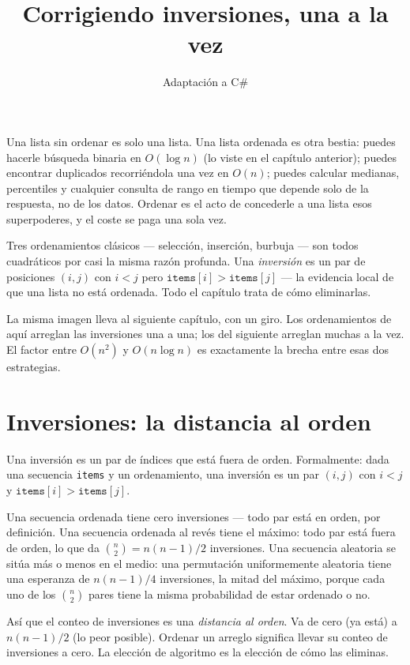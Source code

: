 \documentclass[11pt,a4paper]{article}
\title{Corrigiendo inversiones, una a la vez}
\author{Adaptación a C\#}
\date{}
\begin{document}
\maketitle

Una lista sin ordenar es solo una lista. Una lista ordenada es otra bestia: puedes hacerle búsqueda binaria en $O(\log n)$ (lo viste en el capítulo anterior); puedes encontrar duplicados recorriéndola una vez en $O(n)$; puedes calcular medianas, percentiles y cualquier consulta de rango en tiempo que depende solo de la respuesta, no de los datos. Ordenar es el acto de concederle a una lista esos superpoderes, y el coste se paga una sola vez.

Tres ordenamientos clásicos --- selección, inserción, burbuja --- son todos cuadráticos por casi la misma razón profunda. Una \emph{inversión} es un par de posiciones $(i, j)$ con $i < j$ pero $\texttt{items}[i] > \texttt{items}[j]$ --- la evidencia local de que una lista no está ordenada. Todo el capítulo trata de cómo eliminarlas.

La misma imagen lleva al siguiente capítulo, con un giro. Los ordenamientos de aquí arreglan las inversiones una a una; los del siguiente arreglan muchas a la vez. El factor entre $O(n^2)$ y $O(n \log n)$ es exactamente la brecha entre esas dos estrategias.

\section{Inversiones: la distancia al orden}

Una inversión es un par de índices que está fuera de orden. Formalmente: dada una secuencia \texttt{items} y un ordenamiento, una inversión es un par $(i, j)$ con $i < j$ y $\texttt{items}[i] > \texttt{items}[j]$.

Una secuencia ordenada tiene cero inversiones --- todo par está en orden, por definición. Una secuencia ordenada al revés tiene el máximo: todo par está fuera de orden, lo que da $\binom{n}{2} = n(n-1)/2$ inversiones. Una secuencia aleatoria se sitúa más o menos en el medio: una permutación uniformemente aleatoria tiene una esperanza de $n(n-1)/4$ inversiones, la mitad del máximo, porque cada uno de los $\binom{n}{2}$ pares tiene la misma probabilidad de estar ordenado o no.

Así que el conteo de inversiones es una \emph{distancia al orden}. Va de cero (ya está) a $n(n-1)/2$ (lo peor posible). Ordenar un arreglo significa llevar su conteo de inversiones a cero. La elección de algoritmo es la elección de cómo las eliminas.
\end{document}

